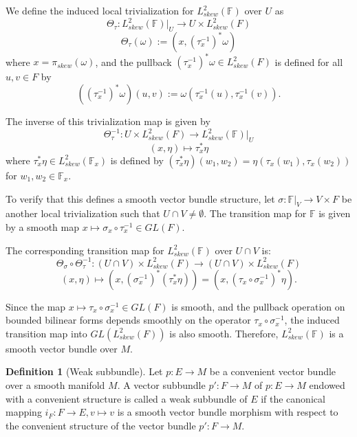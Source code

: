 \documentclass[11pt,reqno]{amsart}
\theoremstyle{definition}
\newtheorem{definition}[theorem]{Definition}
\numberwithin{equation}{section}
\begin{document}
We define the induced local trivialization for $L^2_{skew}(\mathbb{F})$ over $U$ as
\[
\Theta_\tau : L^2_{skew}(\mathbb{F})|_U \to U \times L^2_{skew}(F)
\]
\[
\Theta_\tau(\omega) := (x, (\tau_x^{-1})^*\omega)
\]
where $x = \pi_{skew}(\omega)$, and the pullback $(\tau_x^{-1})^*\omega \in L^2_{skew}(F)$ is defined for all $u, v \in F$ by
\[
((\tau_x^{-1})^*\omega)(u, v) := \omega(\tau_x^{-1}(u), \tau_x^{-1}(v)).
\]

The inverse of this trivialization map is given by
\[
\Theta_\tau^{-1}: U \times L^2_{skew}(F) \to L^2_{skew}(\mathbb{F})|_U
\]
\[
(x, \eta) \mapsto \tau_x^*\eta
\]
where $\tau_x^*\eta \in L^2_{skew}(\mathbb{F}_x)$ is defined by $(\tau_x^*\eta)(w_1, w_2) = \eta(\tau_x(w_1), \tau_x(w_2))$ for $w_1, w_2 \in \mathbb{F}_x$.

To verify that this defines a smooth vector bundle structure, let $\sigma: \mathbb{F}|_V \to V \times F$ be another local trivialization such that $U \cap V \neq \emptyset$. The transition map for $\mathbb{F}$ is given by a smooth map $x \mapsto \sigma_x \circ \tau_x^{-1} \in GL(F)$.

The corresponding transition map for $L^2_{skew}(\mathbb{F})$ over $U \cap V$ is:
\[
\Theta_\sigma \circ \Theta_\tau^{-1}: (U \cap V) \times L^2_{skew}(F) \to (U \cap V) \times L^2_{skew}(F)
\]
\[
(x, \eta) \mapsto (x, (\sigma_x^{-1})^*(\tau_x^*\eta)) = (x, (\tau_x \circ \sigma_x^{-1})^*\eta).
\]

Since the map $x \mapsto \tau_x \circ \sigma_x^{-1} \in GL(F)$ is smooth, and the pullback operation on bounded bilinear forms depends smoothly on the operator $\tau_x \circ \sigma_x^{-1}$, the induced transition map into $GL(L^2_{skew}(F))$ is also smooth. Therefore, $L^2_{skew}(\mathbb{F})$ is a smooth vector bundle over $M$.
\begin{definition}[Weak subbundle]
    Let $p:E\to M$ be a convenient vector bundle over a smooth manifold $M$. A vector subbundle $p':F\to M$ of $p:E\to M$ endowed with a convenient structure is called a weak subbundle of $E$ if the canonical mapping $i_{F}: F\to E, v\mapsto v$ is a smooth vector bundle morphism with respect to the convenient structure of the vector bundle $p':F\to M$. 
\end{definition}
\end{document}
